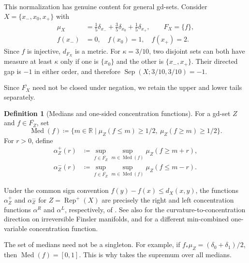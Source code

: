 \documentclass{amsart}
\theoremstyle{plain}
\theoremstyle{definition}
\newtheorem{definition}[theorem]{Definition}
\theoremstyle{remark}
\newcommand{\R}{\mathbb{R}}
\begin{document}
This normalization has genuine content for general gd-sets.  Consider
$X=\{x_-,x_0,x_+\}$ with
\[
\begin{aligned}
\mu_X&=\frac15\delta_{x_-}+\frac35\delta_{x_0}+\frac15\delta_{x_+},
\qquad F_X=\{f\},\\
f(x_-)&=0,\quad f(x_0)=1,\quad f(x_+)=2.
\end{aligned}
\]
Since $f$ is injective, $d_{F_X}$ is a metric.  For $\kappa=3/10$, two
disjoint sets can both have measure at least $\kappa$ only if one is
$\{x_0\}$ and the other is $\{x_-,x_+\}$.  Their directed gap is $-1$ in
either order, and therefore
$\operatorname{Sep}(X;3/10,3/10)=-1$.

Since $\overline{F_X}$ need not be closed under negation, we retain the upper
and lower tails separately.

\begin{definition}[Medians and one-sided concentration functions]
\label{def:one-sided-feature-concentration}
For a gd-set $Z$ and $f\in\overline{F_Z}$, set
\[
\operatorname{Med}(f)\coloneqq
\{m\in\R\mid\mu_Z(f\leq m)\geq1/2,\ \mu_Z(f\geq m)\geq1/2\}.
\]
For $r>0$, define
\begin{align*}
\alpha_Z^+(r)&\coloneqq\sup_{f\in\overline{F_Z}}
\sup_{m\in\operatorname{Med}(f)}\mu_Z(f\geq m+r),\\
\alpha_Z^-(r)&\coloneqq\sup_{f\in\overline{F_Z}}
\sup_{m\in\operatorname{Med}(f)}\mu_Z(f\leq m-r).
\end{align*}
\end{definition}

Under the common sign convention $f(y)-f(x)\leq d_X(x,y)$, the functions
$\alpha_Z^+$ and $\alpha_Z^-$ for $Z=\operatorname{Rep}^{+}(X)$ are
precisely the right and left concentration functions $\alpha^R$ and
$\alpha^L$, respectively, of
\cite[Definitions~3.2 and~3.4 and Lemma~3.6]{stojmirovic2004quasi}.
See also \cite{ohta2021comparison} for the curvature-to-concentration
direction on irreversible Finsler manifolds, and
\cite{cheng-feng2025concentration} for a different min-combined
one-variable concentration function.

The set of medians need not be a singleton.  For example, if
$f_*\mu_Z=(\delta_0+\delta_1)/2$, then
$\operatorname{Med}(f)=[0,1]$.  This is why
 takes the supremum over all
medians.
\end{document}
